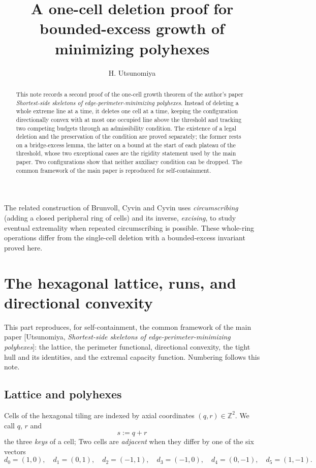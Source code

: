 \documentclass[11pt]{article}
\title{A one-cell deletion proof for bounded-excess growth of minimizing polyhexes}
\author{H. Utsunomiya}
\date{}
\theoremstyle{plain}
\theoremstyle{definition}
\theoremstyle{remark}
\newcommand{\Z}{\mathbb{Z}}
\begin{document}
\maketitle
\begin{abstract}
This note records a second proof of the one-cell growth theorem of the author's paper
\emph{Shortest-side skeletons of edge-perimeter-minimizing polyhexes}. Instead of deleting
a whole extreme line at a time, it deletes one cell at a time, keeping the configuration
directionally convex with at most one occupied line above the threshold and tracking two
competing budgets through an admissibility condition. The existence of a legal deletion and
the preservation of the condition are proved separately; the former rests on a
bridge-excess lemma, the latter on a bound at the start of each plateau of the threshold,
whose two exceptional cases are the rigidity statement used by the main paper. Two
configurations show that neither auxiliary condition can be dropped. The common framework
of the main paper is reproduced for self-containment.
\end{abstract}

The related construction of Brunvoll, Cyvin and Cyvin
\cite[Theorems~1--2]{BrunvollCyvinCyvin1993} uses
\emph{circumscribing} (adding a closed peripheral ring of cells) and its
inverse, \emph{excising}, to study eventual extremality when repeated
circumscribing is possible. These whole-ring operations differ from
the single-cell deletion with a bounded-excess invariant proved here.

\section{The hexagonal lattice, runs, and directional convexity}\label{sec:prelim}

This part reproduces, for self-containment, the common framework of the main paper
[Utsunomiya, \emph{Shortest-side skeletons of edge-perimeter-minimizing polyhexes}]:
the lattice, the perimeter functional, directional convexity, the tight hull and its
identities, and the extremal capacity function. Numbering follows this note.

\subsection{Lattice and polyhexes}\label{sec:2.1}

Cells of the hexagonal tiling are indexed by axial coordinates
\((q,r)\in\Z^{2}\). We call \(q\), \(r\) and
\[
   s:=q+r
\]
the three \emph{keys} of a cell; Two cells are \emph{adjacent} when they differ by one of the six
vectors
\[
   d_{0}=(1,0),\quad d_{1}=(0,1),\quad d_{2}=(-1,1),\quad
   d_{3}=(-1,0),\quad d_{4}=(0,-1),\quad d_{5}=(1,-1).
\]
\end{document}
